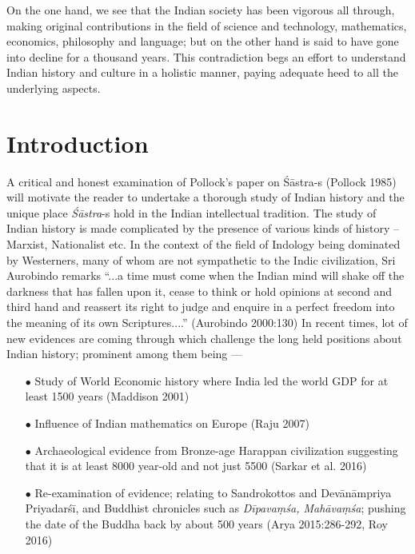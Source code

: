 	On the one hand, we see that the Indian society has been vigorous all through, making original contributions in the ﬁeld of science and technology, mathematics, economics, philosophy and language; but on the other hand is said to have gone into decline for a thousand years. This contradiction begs an effort to understand Indian history and culture in a holistic manner, paying adequate heed to all the underlying aspects.

\section{Introduction}\label{art12-sec1}

A critical and honest examination of Pollock's paper on Śāstra-s (Pollock 1985) will motivate the reader to undertake a thorough study of Indian history and the unique place {\sl Śāstra}-s hold in the Indian intellectual tradition. The study of Indian history is made complicated by the presence of various kinds of history -- Marxist, Nationalist etc. In the context of the ﬁeld of Indology being dominated by Westerners, many of whom are not sympathetic to the Indic civilization, Sri Aurobindo remarks ``...a time must come when the Indian mind will shake off the darkness that has fallen upon it, cease to think or hold opinions at second and third hand and reassert its right to judge and enquire in a perfect freedom into the meaning of its own Scriptures....'' (Aurobindo 2000:130) In recent times, lot of new evidences are coming through which challenge the long held positions about Indian history; prominent among them being ---
\begin{itemize}
\item[$\bullet$] Study of World Economic history where India led the world GDP for at least 1500 years (Maddison 2001)

\item[$\bullet$] Inﬂuence of Indian mathematics on Europe (Raju 2007)

\item[$\bullet$] Archaeological evidence from Bronze-age Harappan civilization suggesting that it is at least 8000 year-old and not just 5500 (Sarkar et al. 2016)

\item[$\bullet$] Re-examination of evidence; relating to Sandrokottos and Devānāmpriya Priyadarśī, and Buddhist chronicles such as {\sl Dīpavaṃśa, Mahāvaṃśa}; pushing the date of the Buddha back by about 500 years (Arya 2015:286-292, Roy 2016)
\end{itemize}

